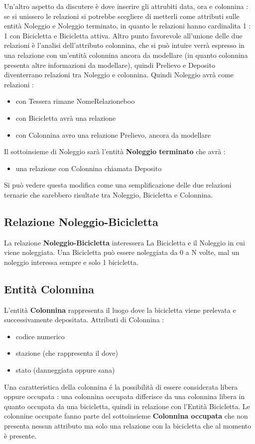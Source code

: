 \documentclass[a4paper,twoside]{article}
\begin{document}
Un'altro aspetto da discutere è dove inserire gli attrubiti data, ora e colonnina : se si unissero le relazioni si potrebbe scegliere di metterli come attributi sulle entità Noleggio e Noleggio terminato, in quanto le relazioni hanno cardinalita 1 : 1 con Bicicletta e Bicicletta attiva.\newline
Altro punto favorevole all'unione delle due relazioni è l'analisi dell'attributo colonnina, che si può intuire verrà espresso in una relazione con un'entità colonnina ancora da modellare (in quanto colonnina presenta altre informazioni da modellare), quindi Prelievo e Deposito diventerrano relazioni tra Noleggio e colonnina.\newline
Quindi Noleggio avrà come relazioni :
\begin{itemize}
 \item con Tessera rimane NomeRelazioneboo
 \item con Bicicletta avrà una relazione
 \item con Colonnina avro una relazione Prelievo, ancora da modellare
\end{itemize}
Il sottoinsieme di Noleggio sarà l'entità \textbf{Noleggio terminato} che avrà :
\begin{itemize}
 \item una relazione con Colonnina chiamata Deposito
\end{itemize}
Si può vedere questa modifica come una semplificazione delle due relazioni ternarie che sarebbero risultate tra Noleggio, Bicicletta e Colonnina.

\subsection{Relazione Noleggio-Bicicletta}
La relazione \textbf{Noleggio-Bicicletta} interessera La Bicicletta e il Noleggio in cui viene noleggiata.\newline
Una Bicicletta può essere noleggiata da 0 a N volte, mal un noleggio interessa sempre e solo 1 bicicletta.

\subsection{Entità Colonnina}
L'entità \textbf{Colonnina} rappresenta il luogo dove la bicicletta viene prelevata e successivamente depositata.\newline
Attributi di Colonnina :
\begin{itemize}
 \item codice numerico
 \item stazione (che rappresenta il dove)
 \item stato (danneggiata oppure sana)
\end{itemize}
Una caratteristica della colonnina é la possibilità di essere considerata libera oppure occupata : una colonnina occupata differisce da una colonnina libera in quanto occupata da una bicicletta, quindi in relazione con l'Entità Bicicletta.
Le colonnine occupate fanno parte del sottoinsieme \textbf{Colonnina occupata} che non presenta nessun attributo ma solo una relazione con la bicicletta che al momento è presente.
\end{document}
